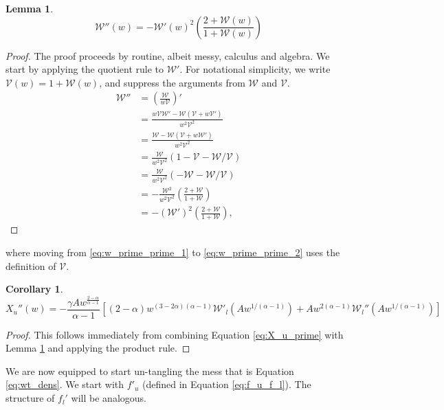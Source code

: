 \documentclass{article}
\newcommand{\sW}{\mathscr{W}}
\newcommand{\sV}{\mathscr{V}}
\newtheorem{lemma}{Lemma}
\newtheorem{corollary}{Corollary}
\begin{document}
\begin{lemma}
    \begin{equation}
        \sW''(w) = - \sW'(w)^2 \left(\frac{2 + \sW(w)}{1 + \sW(w)}\right) \label{eq:W_prime_prime}
    \end{equation}
    \label{lem:W_prime_prime}
\end{lemma}
\begin{proof}
    The proof proceeds by routine, albeit messy, calculus and algebra. We start by applying the quotient rule to $\sW'$. For notational simplicity, we write $\sV(w) = 1 + \sW(w)$, and suppress the arguments from $\sW$ and $\sV$.
    \begin{align}
        \sW'' &= \left( \frac{\sW}{w \sV} \right)'\\
        &= \frac{w \sV \sW' - \sW ( \sV + w \sV')}{w^2 \sV^2}\\
        &= \frac{\sW - \sW (\sV + w \sW')}{w^2 \sV^2}\\
        &= \frac{\sW}{w^2 \sV^2} ( 1 - \sV - \sW / \sV) \label{eq:w_prime_prime_1}\\
        &= \frac{\sW}{w^2 \sV^2} (- \sW - \sW / \sV) \label{eq:w_prime_prime_2}\\
        &= -\frac{\sW^2}{w^2 \sV^2} \left( \frac{2 + \sW}{1 + \sW} \right)\\
        &= - (\sW')^2 \left( \frac{2 + \sW}{1 + \sW} \right),
    \end{align}
\end{proof}
where moving from \ref{eq:w_prime_prime_1} to \ref{eq:w_prime_prime_2} uses the definition of $\sV$.

\begin{corollary}
    \begin{equation}
        X_u''(w) = - \frac{\gamma A  w^{\frac{2-\alpha}{\alpha-1}}}{\alpha-1} \left[ (2-\alpha) w^{(3-2\alpha)(\alpha-1)} \sW'_l(A w^{1/(\alpha-1)}) + A w^{2(\alpha-1)} \sW_l''(A w^{1/(\alpha-1)}) \right]
    \end{equation}
\end{corollary}
\begin{proof}
    This follows immediately from combining Equation \ref{eq:X_u_prime} with Lemma \ref{lem:W_prime_prime} and applying the product rule.
\end{proof}

 We are now equipped to start un-tangling the mess that is Equation \eqref{eq:wt_dens}. We start with $f'_u$ (defined in Equation \eqref{eq:f_u_f_l}). The structure of $f_l'$ will be analogous. 
\end{document}
